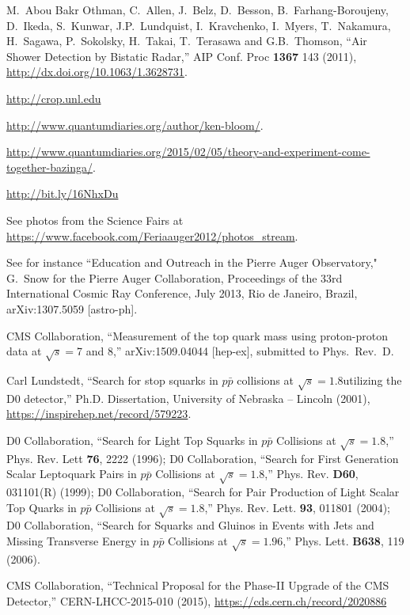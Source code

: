 \begin{thebibliography}{99}
 M.~Abou Bakr Othman, C.~Allen, J.~Belz, D.~Besson,
  B.~Farhang-Boroujeny, D.~Ikeda, S.~Kunwar, J.P.~Lundquist, I.~Kravchenko,
  I.~Myers, T.~Nakamura, H.~Sagawa, P.~Sokolsky, H.~Takai, T.~Terasawa and
  G.B.~Thomson, ``Air Shower Detection by Bistatic Radar,'' AIP Conf. Proc
  {\bf 1367} 143 (2011), \url{http://dx.doi.org/10.1063/1.3628731}.

 \url{http://crop.unl.edu}

 \url{http://www.quantumdiaries.org/author/ken-bloom/}.

 \url{http://www.quantumdiaries.org/2015/02/05/theory-and-experiment-come-together-bazinga/}.

 \url{http://bit.ly/16NhxDu}

 See photos from the Science Fairs at \url{https://www.facebook.com/Feriaauger2012/photos_stream}.

 See for instance
``Education and Outreach in the Pierre Auger Observatory," G.~Snow for the Pierre
Auger Collaboration, Proceedings of the 33rd International Cosmic Ray Conference,
July 2013, Rio de Janeiro, Brazil, arXiv:1307.5059 [astro-ph].


CMS Collaboration, ``Measurement of the top quark mass using proton-proton data at $\sqrt{s}=$7 and 8\TeV,'' arXiv:1509.04044 [hep-ex], submitted to Phys.~Rev.~D.

Carl Lundstedt, ``Search for stop squarks in $p\bar{p}$ collisions at $\sqrt{s} = 1.8$\TeV utilizing the D0 detector,'' Ph.D. Dissertation, University of Nebraska -- Lincoln (2001), \url{https://inspirehep.net/record/579223}.

D0 Collaboration, ``Search for Light Top Squarks in $p\bar{p}$ Collisions at $\sqrt{s}=1.8$\TeV,'' Phys. Rev. Lett {\bf 76}, 2222 (1996);
D0 Collaboration, ``Search for First Generation Scalar Leptoquark Pairs in $p\bar{p}$ Collisions at $\sqrt{s} = 1.8$\TeV,'' Phys. Rev. {\bf D60}, 031101(R) (1999);
D0 Collaboration, ``Search for Pair Production of Light Scalar Top Quarks in $p\bar{p}$ Collisions at $\sqrt{s}=1.8$\TeV,'' Phys. Rev. Lett. {\bf 93}, 011801 (2004);
D0 Collaboration, ``Search for Squarks and Gluinos in Events with Jets and Missing Transverse Energy in $p\bar{p}$ Collisions at $\sqrt{s}=1.96$\TeV,'' Phys. Lett. {\bf B638}, 119 (2006).

CMS Collaboration, ``Technical Proposal for the Phase-II Upgrade of the CMS Detector,'' CERN-LHCC-2015-010 (2015), \url{https://cds.cern.ch/record/2020886}


\end{thebibliography}
